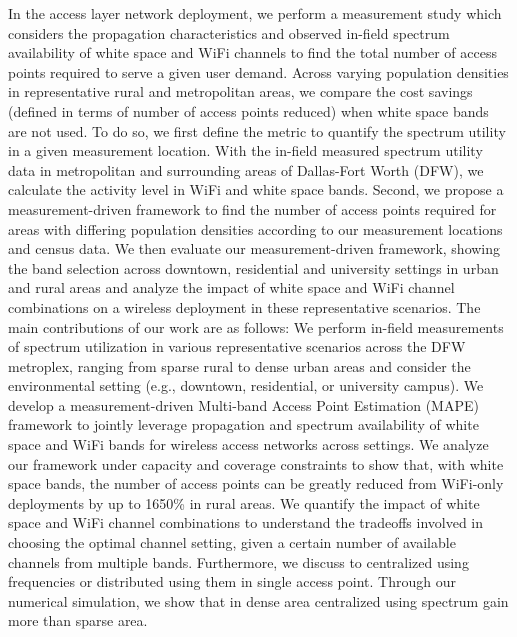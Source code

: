 In the access layer network deployment, we perform a measurement study which considers the propagation 
characteristics and observed in-field spectrum availability of white space
and WiFi channels to find the total number of access points required to serve a 
given user demand. Across varying population densities in representative 
rural and metropolitan areas, we compare the cost savings (defined in terms of
number of access points reduced) when white space bands are not used.
To do so, we first define the metric to quantify the spectrum utility in a
given measurement location. With the in-field measured spectrum utility data 
in metropolitan and surrounding areas of Dallas-Fort Worth (DFW), we 
calculate the activity level in WiFi and white space bands. Second, we 
propose a measurement-driven framework to find the number of access points required 
for areas with differing population densities according to our measurement locations
and census data. We then evaluate our measurement-driven framework, showing
the band selection across downtown, residential and university settings in
urban and rural areas and analyze the impact of white space and WiFi
channel combinations on a wireless deployment in these representative scenarios.
The main contributions of our work are as follows:
We perform in-field measurements of spectrum utilization in various representative
scenarios across the DFW metroplex, ranging from sparse rural to dense urban areas and 
consider the environmental setting (e.g., downtown, residential, or university campus).
We develop a measurement-driven Multi-band Access Point Estimation (MAPE) framework 
to jointly leverage propagation and spectrum availability of white space and WiFi bands 
for wireless access networks across settings.
We analyze our framework under capacity and coverage constraints 
to show that, with white space bands, the number of access points can be greatly
reduced from WiFi-only deployments by up to 1650\% in rural areas.
We quantify the impact of white space and WiFi channel
combinations to understand the tradeoffs involved in choosing the optimal channel setting,
given a certain number of available channels from multiple bands.
Furthermore, we discuss to centralized using frequencies or distributed using them in 
single access point. Through our numerical simulation, we show that in dense area
centralized using spectrum gain more than sparse area.


